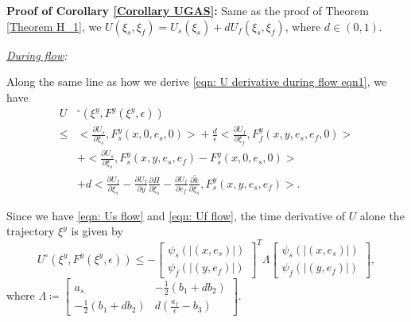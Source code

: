 \newpage
\textbf{Proof of Corollary \ref{Corollary UGAS}:}
Same as the proof of Theorem \ref{Theorem H_1}, we $U(\xi_s, \xi_f) = U_s(\xi_s)+d U_f(\xi_s, \xi_f)$, where $d \in (0,1)$. 

\noindent\emph{\underline{During flow}:} 

Along the same line as how we derive \eqref{eqn: U derivative during flow eqn1}, we have
\begin{equation*}
    \begin{aligned}
        U&^\circ(\xi^y, F^y(\xi^y, \epsilon)) 
        \\
      \leq  &  \Big< \! \tfrac{\partial {U_s}}{\partial \xi_s}, F_s^y(x,0,e_s, 0) \! \Big>\! +\! \tfrac{d}{\epsilon} \Big<\! \tfrac{\partial {U_f}}{\partial \xi_f}, F_f^y(x,y,e_s, e_f,0) \!  \Big>
        \\
        & + \Big< \tfrac{\partial {U_s}}{\partial \xi_s}, F_s^y(x,y,e_s,e_f) - F_s^y(x,0,e_s,0)  \Big>
        \\
        & + d \Big<  \tfrac{\partial {U_f}}{\partial \xi_s} - \tfrac{\partial {U_f}}{\partial y} \tfrac{\partial \overline{H}}{\partial \xi_s} - \tfrac{\partial {U_f}}{\partial e_f} \tfrac{\partial \tilde k}{\partial \xi_s} ,F_s^y(x,y,e_s,e_f)\Big>.
    \end{aligned}
\end{equation*}


Since we have \eqref{eqn: Us flow} and \eqref{eqn: Uf flow}, the time derivative of $U$ alone the trajectory $\xi^y$ is given by
\begin{equation*}
     U^\circ(\xi^y, F^y(\xi^y, \epsilon)) \leq - 
     \begin{bmatrix}
         \psi_s(|(x,e_s)|) \\ \psi_f(|(y,e_f)|) 
     \end{bmatrix}^T \Lambda \begin{bmatrix}
         \psi_s(|(x,e_s)|) \\ \psi_f(|(y,e_f)|) 
     \end{bmatrix},
\end{equation*}
where $\Lambda \coloneqq \begin{bmatrix}
     a_s & -\tfrac{1}{2}(b_1 + d b_2) \\
    -\tfrac{1}{2}(b_1 + d b_2) & d (\tfrac{a_f}{\epsilon} - b_3)
\end{bmatrix}$. 

